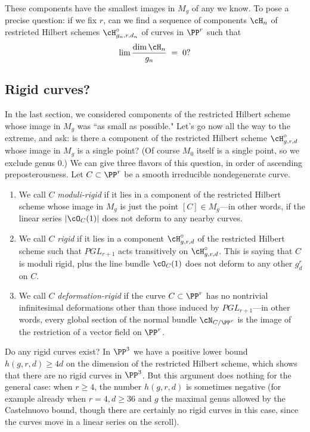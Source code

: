 These components have the smallest images in $M_{g}$ of any we know. To pose a precise question: if we fix $r$, can we find a sequence of components $\cH_n$ of  restricted Hilbert schemes  $\cH^\circ_{g_n,r,d_n}$ of curves in $\PP^r$ such that
$$
\lim \frac{\dim \cH_n}{g_n} \; = \; 0?
$$

\subsection{Rigid curves?}\label{rigid?}

In the last section, we considered components of the restricted Hilbert scheme whose image in $M_g$ was ``as small as possible." Let's go now all the way to the extreme, and ask: is there a component of the restricted Hilbert scheme $\cH^\circ_{g,r,d}$ whose image in $M_g$ is a single point? (Of course $M_0$ itself is a single point, so we exclude genus 0.) We can give three flavors of this question, in order of ascending preposterousness. Let $C \subset \PP^r$ be
a smooth irreducible nondegenerate curve.

\begin{enumerate} 
\item We call $C$ \emph{moduli-rigid} if it lies in a component of the restricted Hilbert scheme whose image in $M_g$ is just the point $[C] \in M_g$---in other words, if the linear series $|\cO_C(1)|$ does not deform to any nearby curves.

\item We call $C$ \emph{rigid} if it lies in a component $\cH^\circ_{g,r,d}$ of the restricted Hilbert scheme such that $PGL_{r+1}$ acts transitively on $\cH^\circ_{g,r,d}$. This is saying that $C$ is moduli rigid, plus the line bundle $\cO_C(1)$ does not deform to any other $g^r_d$ on $C$.

\item We call $C$ \emph{deformation-rigid} if the curve $C \subset \PP^r$ has no nontrivial infinitesimal deformations other than those induced by $PGL_{r+1}$---in other words, every global section of the normal bundle $\cN_{C/\PP^r}$ is the image of the restriction of a vector field on $\PP^r$.
\end{enumerate}

Do any rigid curves exist? In $\PP^{3}$ we have a positive lower bound $h(g,r,d)\geq 4d$
on the dimension of the restricted Hilbert scheme, which shows that there are no rigid
curves in $\PP^{3}$. But this argument does nothing for the general case:
when $r \geq 4$, the number $h(g,r,d)$ is sometimes negative
(for example already when $r = 4, d\geq 36$ and $g$ the maximal genus allowed by
the Castelnuovo bound, though there are certainly no rigid curves in this case,
since the curves move in a linear series on the scroll).

